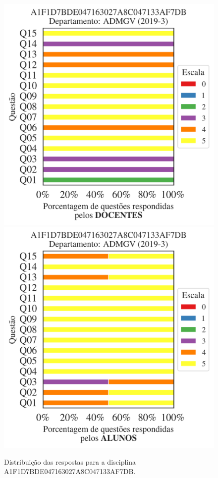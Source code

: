 \documentclass[a4paper,10pt]{article}
\begin{document}
\begin{figure}[h]
\centering
\includegraphics[width=0.485\linewidth]{analise_disciplina_departamento_ADMGV_A1F1D7BDE047163027A8C047133AF7DB_docentes.png}
\includegraphics[width=0.485\linewidth]{analise_disciplina_departamento_ADMGV_A1F1D7BDE047163027A8C047133AF7DB_alunos.png}
\caption{\label{fig:analise_geral_departamento}                Distribuição das respostas para a disciplina A1F1D7BDE047163027A8C047133AF7DB. }
\end{figure}
\end{document}
